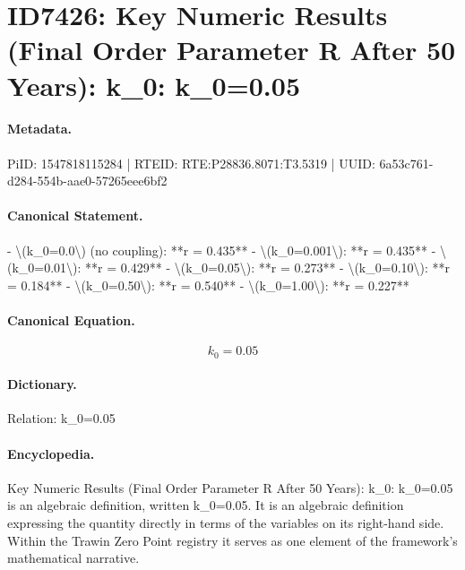 \section*{ID7426: Key Numeric Results (Final Order Parameter R After 50 Years): k\_0: k\_0=0.05}
\paragraph{Metadata.}
PiID: 1547818115284 | RTEID: RTE:P28836.8071:T3.5319 | UUID: 6a53c761-d284-554b-aae0-57265eee6bf2

\paragraph{Canonical Statement.}
- \textbackslash{}(k\_0=0.0\textbackslash{}) (no coupling): **r = 0.435** - \textbackslash{}(k\_0=0.001\textbackslash{}): **r = 0.435** - \textbackslash{}(k\_0=0.01\textbackslash{}): **r = 0.429** - \textbackslash{}(k\_0=0.05\textbackslash{}): **r = 0.273** - \textbackslash{}(k\_0=0.10\textbackslash{}): **r = 0.184** - \textbackslash{}(k\_0=0.50\textbackslash{}): **r = 0.540** - \textbackslash{}(k\_0=1.00\textbackslash{}): **r = 0.227**

\paragraph{Canonical Equation.}
\[
k_0=0.05
\]

\paragraph{Dictionary.}
Relation: k\_0=0.05

\paragraph{Encyclopedia.}
Key Numeric Results (Final Order Parameter R After 50 Years): k\_0: k\_0=0.05 is an algebraic definition, written k\_0=0.05. It is an algebraic definition expressing the quantity directly in terms of the variables on its right-hand side. Within the Trawin Zero Point registry it serves as one element of the framework's mathematical narrative.
